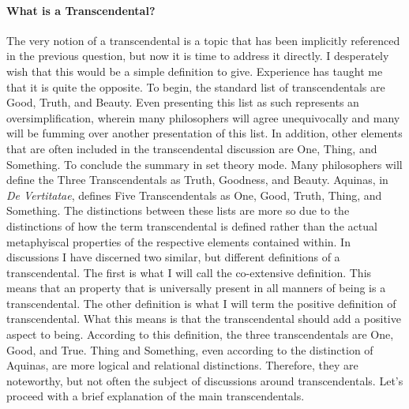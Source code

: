 \documentclass{ucetd}
\begin{document}
\paragraph{What is a Transcendental?}
The very notion of a transcendental is a topic that has been implicitly referenced in the previous question, but now it is time to address it directly. I desperately wish that this would be a simple definition to give. Experience has taught me that it is quite the opposite. To begin, the standard list of transcendentals are Good, Truth, and Beauty. Even presenting this list as such represents an oversimplification, wherein many philosophers will agree unequivocally and many will be fumming over another presentation of this list. In addition, other elements that are often included in the transcendental discussion are One, Thing, and Something. To conclude the summary in set theory mode. Many philosophers will define the Three Transcendentals as Truth, Goodness, and Beauty. Aquinas, in \textit{De Vertitatae}, defines Five Transcendentals as One, Good, Truth, Thing, and Something. The distinctions between these lists are more so due to the distinctions of how the term transcendental is defined rather than the actual metaphyiscal properties of the respective elements contained within. In discussions I have discerned two similar, but different definitions of a transcendental. The first is what I will call the co-extensive definition. This means that an property that is universally present in all manners of being is a transcendental. The other definition is what I will term the positive definition of transcendental. What this means is that the transcendental should add a positive aspect to being. According to this definition, the three transcendentals are One, Good, and True. Thing and Something, even according to the distinction of Aquinas, are more logical and relational distinctions. Therefore, they are noteworthy, but not often the subject of discussions around transcendentals. Let's proceed with a brief explanation of the main transcendentals.
\end{document}
